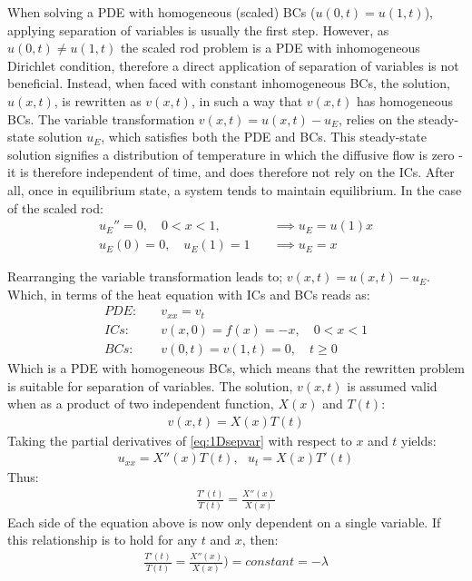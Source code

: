\documentclass[%
oneside,                 %
final,                   %
10pt]{article}
\begin{document}
When solving a PDE with homogeneous (scaled) BCs ($u(0,t)=u(1,t)$), applying separation of variables is usually the first step. However, as $u(0,t)\neq u(1,t)$ the scaled rod problem is a PDE with inhomogeneous Dirichlet condition, therefore a direct application of separation of variables is not beneficial. Instead, when faced with constant inhomogeneous BCs, the solution, $u(x,t)$, is rewritten as $v(x,t)$, in such a way that $v(x,t)$  has homogeneous BCs.  \newline
The variable transformation $v(x,t)=u(x,t)-u_E$, relies on the steady-state solution $u_E$, which satisfies both the PDE and BCs. This steady-state solution signifies a distribution of temperature in which the diffusive flow is zero - it is therefore independent of time, and does therefore not rely on the ICs. After all, once in equilibrium state, a system tends to maintain equilibrium.  In the case of the scaled rod:
\begin{align}
u_E''=0,\quad 0<x<1, \quad &\implies u_E=u(1)x\\
u_E(0)=0, \quad u_E(1)=1 \quad &\implies u_E=x
\end{align}

Rearranging the variable transformation leads to; $v(x,t)=u(x,t)-u_E$. Which, in terms of the heat equation with ICs and BCs reads as:
\begin{align}
PDE:& \quad v_{xx}= v_t \\
ICs:& \quad v(x,0)=f(x)=-x, \quad 0 < x < 1 \label{eq:ICv}\\
BCs:& \quad v(0,t)= v(1,t)=0, \quad t\geq 0 
\end{align}
Which is a PDE with homogeneous BCs, which means that  the rewritten problem is suitable for separation of variables. The solution, $v(x,t)$ is assumed valid when as a product of two independent function, $X(x)$ and $T(t)$:
\begin{align}
v(x,t)=X(x)T(t) \label{eq:1Dsepvar}
\end{align}
Taking the partial derivatives of \eqref{eq:1Dsepvar} with respect to $x$ and $t$ yields:
\begin{align}
u_{xx}=X''(x)T(t), \text{		} u_t=X(x)T'(t)
\end{align}
Thus:
\begin{align}
\frac{T'(t)}{T(t)}=\frac{X''(x)}{X(x)} \label{1D.eq:Tt=Xx}
\end{align}
Each side of the equation above is now only dependent on a single variable. If this relationship is to hold for any $t$ and $x$, then:
\begin{align}
\frac{T'(t)}{T(t)}=\frac{X''(x)}{X(x)})=constant=-\lambda
\end{align}
\end{document}
